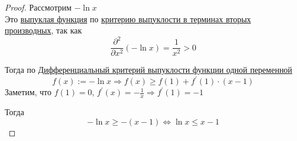 

\begin{proof}
  Рассмотрим $- \ln x$ \\
  Это \hyperref[note:1CA14F2C-637F-41DE-9E97-72075D19E97F]{выпуклая функция} по \hyperref[note:86FCE16B-C82E-4416-851C-0E0AD0FDA382]{критерию выпуклости в терминах вторых производных}, так как
  \[
  \frac{\partial^2}{\partial x^2} (-\ln x) = \frac{1}{x^2} > 0
  \]

  Тогда по \hyperref[note:2F475EE4-2630-45FD-8DD2-8EA9D48059E4]{Дифференциальный критерий выпуклости функции одной переменной}
  \[
  f(x) := -\ln x \Rightarrow f(x) \ge f(1) + f^{\prime}(1) \cdot (x-1)
  \]
  Заметим, что $f(1) = 0$, $f^{\prime}(x) = - \frac{1}{x} \Rightarrow f^{\prime}(1) = -1$

  Тогда
  \[-
  \ln x \ge - (x - 1) \Leftrightarrow \ln x \le x - 1
  \]
\end{proof}
